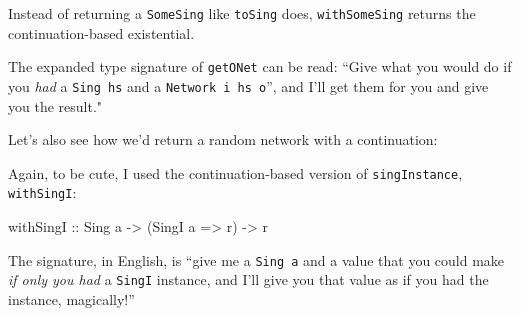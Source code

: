\documentclass[]{article}
\newenvironment{Shaded}{}{}
\newcommand{\KeywordTok}[1]{\textcolor[rgb]{0.00,0.44,0.13}{\textbf{{#1}}}}
\newcommand{\DataTypeTok}[1]{\textcolor[rgb]{0.56,0.13,0.00}{{#1}}}
\newcommand{\CommentTok}[1]{\textcolor[rgb]{0.38,0.63,0.69}{\textit{{#1}}}}
\newcommand{\OtherTok}[1]{\textcolor[rgb]{0.00,0.44,0.13}{{#1}}}
\newcommand{\FunctionTok}[1]{\textcolor[rgb]{0.02,0.16,0.49}{{#1}}}
\newcommand{\NormalTok}[1]{{#1}}
\begin{document}
Instead of returning a \texttt{SomeSing} like \texttt{toSing} does,
\texttt{withSomeSing} returns the continuation-based existential.

The expanded type signature of \texttt{getONet\textquotesingle{}} can be read:
``Give what you would do if you \emph{had} a \texttt{Sing\ hs} and a
\texttt{Network\ i\ hs\ o}'', and I'll get them for you and give you the
result."

Let's also see how we'd return a random network with a continuation:

\begin{Shaded}
\end{Shaded}

Again, to be cute, I used the continuation-based version of
\texttt{singInstance}, \texttt{withSingI}:

\begin{Shaded}
\begin{Highlighting}[]
\OtherTok{withSingI ::} \DataTypeTok{Sing} \NormalTok{a }\OtherTok{->} \NormalTok{(}\DataTypeTok{SingI} \NormalTok{a }\OtherTok{=>} \NormalTok{r) }\OtherTok{->} \NormalTok{r}
\end{Highlighting}
\end{Shaded}

The signature, in English, is ``give me a \texttt{Sing\ a} and a value that you
could make \emph{if only you had} a \texttt{SingI} instance, and I'll give you
that value as if you had the instance, magically!''
\end{document}
